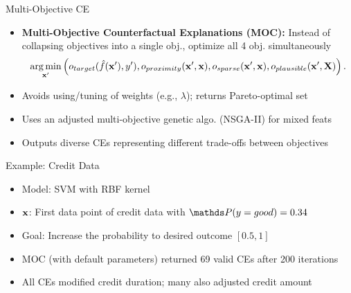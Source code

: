 \documentclass[10pt,compress,t,notes=noshow, xcolor=table]{beamer}
\begin{document}
\begin{frame}{Multi-Objective CE }
	\begin{itemize}
		\item \textbf{Multi-Objective Counterfactual Explanations (MOC):} Instead of collapsing objectives into a single obj., optimize all 4 obj. simultaneously
	$$	\mathop{\mathrm{arg\,min}}_{\mathbf{x}'} \left(o_{target}(\hat{f}(\mathbf{x}'), y'), o_{proximity}(\mathbf{x}', \mathbf{x}), o_{sparse}(\mathbf{x}', \mathbf{x}), o_{plausible}(\mathbf{x}', \mathbf{X}) \right). $$
		
		\item Avoids using/tuning of weights (e.g., \(\lambda\)); returns Pareto-optimal set
		\item Uses an adjusted multi-objective genetic algo. (NSGA-II) for mixed feats %
		\item Outputs diverse CEs representing different trade-offs between objectives
	\end{itemize}

\end{frame}

\begin{frame}{Example: Credit Data}
	\begin{itemize}
		\item Model: SVM with RBF kernel
		\item $\mathbf{x}$: First data point of credit data with $\P(y = good)  = 0.34$ %
		\item Goal: Increase the probability to desired outcome $[0.5, 1]$
		\item MOC (with default parameters) returned 69 valid CEs after 200 iterations%
		\item All CEs modified credit duration; many also adjusted credit amount
	\end{itemize}
\end{frame}
\end{document}
